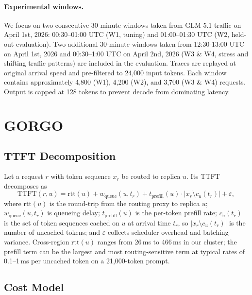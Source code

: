 \documentclass{article}
\begin{document}
\paragraph{Experimental windows.}
We focus on two consecutive 30-minute windows taken from GLM-5.1 traffic on April 1st, 2026: 00:30--01:00
UTC (W1, tuning) and 01:00--01:30 UTC (W2, held-out evaluation). Two additional 30-minute windows taken from 12:30-13:00 UTC on April 1st, 2026 and 00:30--1:00 UTC on April 2nd, 2026 (W3 \& W4, stress and shifting traffic patterns) are included in the evaluation. Traces are
replayed at original arrival speed and pre-filtered to 24{,}000 input tokens.
Each window contains approximately 4{,}800 (W1), 4{,}200 (W2), and 3{,}700 (W3 \& W4) requests.
Output is capped at 128 tokens to prevent decode from dominating latency.

\section{GORGO}
\label{sec:method}

\subsection{TTFT Decomposition}

Let a request $r$ with token sequence $x_r$ be routed to replica $u$. Its TTFT
decomposes as
\begin{equation}
\mathrm{TTFT}(r,u) = \mathrm{rtt}(u) + w_{\mathrm{queue}}(u,t_r)
  + t_{\mathrm{prefill}}(u)\cdot|x_r \setminus c_u(t_r)| + \varepsilon,
\label{eq:ttft}
\end{equation}
where $\mathrm{rtt}(u)$ is the round-trip from the routing proxy to replica $u$;
$w_{\mathrm{queue}}(u,t_r)$ is queueing delay; $t_{\mathrm{prefill}}(u)$ is
the per-token prefill rate; $c_u(t_r)$ is the set of token sequences cached on
$u$ at arrival time $t_r$, so $|x_r \setminus c_u(t_r)|$ is the number of uncached tokens; and $\varepsilon$ collects scheduler overhead and
batching variance. Cross-region $\mathrm{rtt}(u)$ ranges from 26\,ms to 466\,ms
in our cluster; the prefill term can be the largest and most routing-sensitive
term at typical rates of 0.1--1\,ms per uncached token on a 21{,}000-token
prompt.

\subsection{Cost Model}
\end{document}

